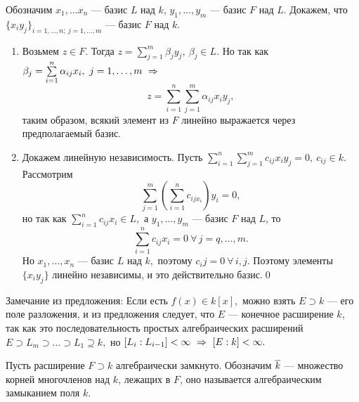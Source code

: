 \dok Обозначим $x_1,\dots x_n$ --- базис $L$ над $k$, $y_1,\dots, y_m$ --- базис $F$ над $L$. Докажем, что $\{x_iy_j\}_{i=1,\dots, n;\ j=1,\dots, m}$ --- базис $F$ над $k$.
\begin{enumerate}
    \item Возьмем $z\in F.$ Тогда $z=\sum\limits_{j=1}^m\beta_jy_j,\ \beta_j\in L.$ Но так как $\beta_j=\sum\limits_{i=1}^n\alpha_{ij}x_i,\ j=1,\dots, m\ra$
    $$z=\sum\limits_{i=1}^n\sum\limits_{j=1}^m\alpha_{ij}x_iy_j,$$ таким образом, всякий элемент из $F$ линейно выражается через предполагаемый базис.
    \item Докажем линейную независимость. Пусть $\sum\limits_{i=1}^n\sum\limits_{j=1}^mc_{ij}x_iy_j=0,\ c_{ij}\in k.$ Рассмотрим $$\sum_{j=1}^m\left(\sum\limits_{i=1}^nc_{ijx_i}\right)y_i=0,$$ но
    так как $\sum\limits_{i=1}^nc_{ij}x_i\in L,$ а $y_1,\dots, y_m$ --- базис $F$ над $L$, то $$\sum\limits_{i=1}^nc_{ij}x_i=0\ \forall\,j=q,\dots,m.$$
    Но $x_1,\dots,x_n$ --- базис $L$ над $k,$ поэтому $c_ij=0\ \forall\,i,j.$ Поэтому элементы $\{x_iy_j\}$ линейно независимы, и это действительно базис.\qquad\qed
\end{enumerate}

Замечание из предложения: Если есть $f(x)\in k[x],$ можно взять $E\supset k$ --- его поле разложения, и из предложения следует, что $E$ --- конечное
расширение $k$, так как это последовательность простых алгебраических расширений $E\supset L_m\supset \dots\supset L_1\supseteq k,$ но $[L_i:L_{i-1}]<\infty\ \Rightarrow\ [E:k]<\infty.$

Пусть расширение $F\supset k$ алгебраически замкнуто. Обозначим $\overline{k}$ --- множество корней многочленов над $k$, лежащих в $F$, оно называется алгебраическим замыканием поля $k$.

